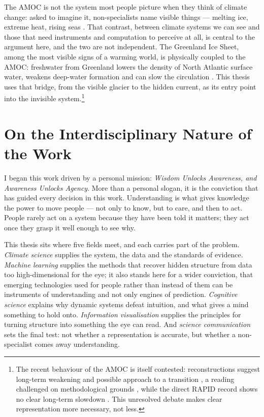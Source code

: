 The AMOC is not the system most people picture when they think of climate change: asked to imagine it, non-specialists name visible things --- melting ice, extreme heat, rising seas \citep{oneill2014}. That contrast, between climate systems we can see and those that need instruments and computation to perceive at all, is central to the argument here, and the two are not independent. The Greenland Ice Sheet, among the most visible signs of a warming world, is physically coupled to the AMOC: freshwater from Greenland lowers the density of North Atlantic surface water, weakens deep-water formation and can slow the circulation \citep{boning2016, caesar2018, rahmstorf2015}. This thesis uses that bridge, from the visible glacier to the hidden current, as its entry point into the invisible system.\footnote{The recent behaviour of the AMOC is itself contested: reconstructions suggest long-term weakening and possible approach to a transition \citep{caesar2018, boers2021, ditlevsen2023}, a reading challenged on methodological grounds \citep{benyami2024}, while the direct RAPID record shows no clear long-term slowdown \citep{moat2026}. This unresolved debate makes clear representation more necessary, not less.}

\section{On the Interdisciplinary Nature of the Work}
\label{sec:positioning}

I began this work driven by a personal mission: \emph{Wisdom Unlocks Awareness, and Awareness Unlocks Agency}. More than a personal slogan, it is the conviction that has guided every decision in this work. Understanding is what gives knowledge the power to move people --- not only to know, but to care, and then to act. People rarely act on a system because they have been told it matters; they act once they grasp it well enough to see why.

This thesis sits where five fields meet, and each carries part of the problem. \emph{Climate science} supplies the system, the data and the standards of evidence. \emph{Machine learning} supplies the methods that recover hidden structure from data too high-dimensional for the eye; it also stands here for a wider conviction, that emerging technologies used for people rather than instead of them can be instruments of understanding and not only engines of prediction. \emph{Cognitive science} explains why dynamic systems defeat intuition, and what gives a mind something to hold onto. \emph{Information visualisation} supplies the principles for turning structure into something the eye can read. And \emph{science communication} sets the final test: not whether a representation is accurate, but whether a non-specialist comes away understanding.

